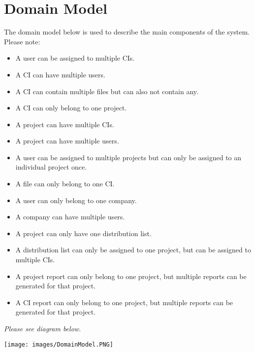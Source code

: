 \documentclass[11pt]{article}
\begin{document}
\section{Domain Model}
\begin{flushleft}
The domain model below is used to describe the main components of the system. Please note:\\[0.5cm]
\begin{itemize}
    \item A user can be assigned to multiple CIs.
    \item A CI can have multiple users.
    \item A CI can contain multiple files but can also not contain any.
    \item A CI can only belong to one project.
    \item A project can have multiple CIs.
    \item A project can have multiple users.
    \item A user can be assigned to multiple projects but can only be assigned to an individual project once.
    \item A file can only belong to one CI.
    \item A user can only belong to one company.
    \item A company can have multiple users.
    \item A project can only have one distribution list.
    \item A distribution list can only be assigned to one project, but can be assigned to multiple CIs.
    \item A project report can only belong to one project, but multiple reports can be generated for that project.
    \item A CI report can only belong to one project, but multiple reports can be generated for that project.

\end{itemize}


\textit{Please see diagram below.}\\[0.5cm]
\end{flushleft}
\begin{sidewaysfigure}
    \texttt{[image: images/DomainModel.PNG]}
\end{sidewaysfigure}
 \newpage
\end{document}
